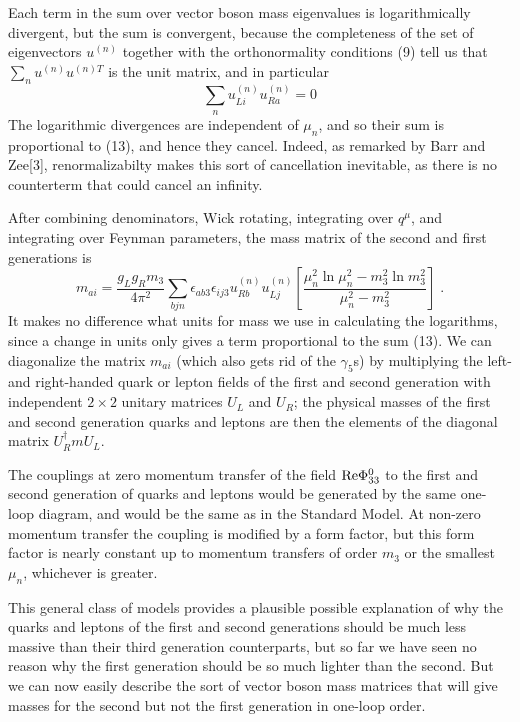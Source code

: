 Each term in the sum over vector boson mass eigenvalues is logarithmically divergent, but the sum is convergent, because 
the completeness of the set of eigenvectors $u^{(n)}$ together with the orthonormality conditions (9) tell us that
$\sum_n u^{(n)}u^{(n)T}$ is the unit matrix, and in particular
\begin{equation}
\sum_n u_{Li}^{(n)}u_{Ra}^{(n)}=0
\end{equation}
The logarithmic divergences are independent of $\mu_n$, and so their sum is proportional to (13), and hence they cancel.  Indeed, as remarked by Barr and Zee[3], renormalizabilty makes this sort of  cancellation  inevitable, as there is no counterterm that could cancel an infinity.

 
After combining denominators, Wick rotating, integrating over $q^\mu$, and integrating over Feynman parameters, the mass matrix of the second and first generations is
\begin{equation}
m_{ai}=\frac{g_Lg_R m_3}{4\pi^2}\sum_{bjn}\epsilon_{ab3}\epsilon_{ij3}  u_{Rb}^{(n)}u_{Lj}^{(n)}\left[\frac{\mu_n^2\ln \mu_n^2-m_3^2\ln m_3^2}{\mu_n^2-m_3^2}
\right]\;.
\end{equation}
It makes no difference what units for mass we use in calculating the logarithms, since a change in units only gives a term proportional to the sum (13).
We can diagonalize the matrix $m_{ai}$ (which also gets rid of the $\gamma_5$s)   by multiplying  the left- and right-handed quark or lepton fields of the first and second generation with independent $2\times 2$  unitary matrices $U_L$ and $U_R$; the physical masses of the first and second generation quarks and leptons are then the  elements of the diagonal matrix $U_R^\dagger m U_L$.  

The couplings at zero momentum transfer of the field ${\rm Re}\Phi^0_{33}$ to the first and second generation of quarks and leptons would be generated by the same one-loop diagram, and would be the same as in the Standard Model.  At non-zero momentum transfer the coupling is modified by a form factor, but this form factor is   nearly  constant up to momentum transfers of order $m_3$ or the smallest $\mu_n$, whichever is greater.


This general class of models provides a plausible possible explanation of why the quarks and leptons of the first and second generations should be much less massive than their third generation counterparts, but so far we have seen no reason why the first generation should be so much lighter than the second.  But we can now easily describe the sort of vector  boson mass matrices that will give  masses for the second but not the first generation in one-loop order.  

